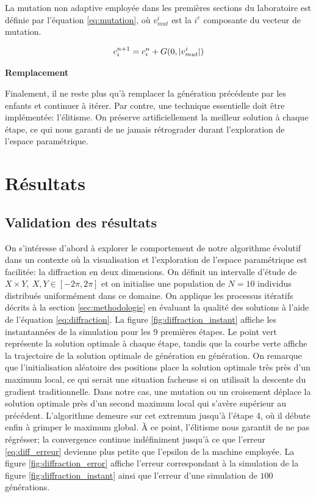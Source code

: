 \documentclass{article}
\DeclarePairedDelimiter\absol{\lvert}{\rvert}%
\begin{document}
La mutation non adaptive employée dans les premières sections du laboratoire est définie par l'équation \ref{eq:mutation}, où $v^i_{mut}$ est la $i^e$ composante du vecteur de mutation. 

\begin{equation}\label{eq:mutation}
	c^{n+1}_{i} = c^{n}_{i} + G(0, \absol{v^i_{mut}})
\end{equation}

\vspace{0.3cm}
\noindent\textbf{Remplacement}

Finalement, il ne reste plus qu'à remplacer la génération précédente par les enfants et continuer à itérer. Par contre, une technique essentielle doit être implémentée: l'élitisme. On préserve artificiellement la meilleur solution à chaque étape, ce qui nous garanti de ne jamais rétrograder durant l'exploration de l'espace paramétrique. 


\section{Résultats}\label{sec:resultat}

\subsection{Validation des résultats}

On s'intéresse d'abord à explorer le comportement de notre algorithme évolutif dans un contexte où la visualisation et l'exploration de l'espace paramétrique est facilitée: la diffraction en deux dimensions. On définit un intervalle d'étude de $X \times Y,\ X,Y \in [-2 \pi, 2 \pi]$ et on initialise une population de $N=10$ individus distribués uniformément dans ce domaine. On applique les processus itératifs décrits à la section \ref{sec:methodologie} en évaluant la qualité des solutions à l'aide de l'équation \ref{eq:diffraction}. La figure \ref{fig:diffraction_instant} affiche les instantannées de la simulation pour les 9 premières étapes. Le point vert représente la solution optimale à chaque étape, tandis que la courbe verte affiche la trajectoire de la solution optimale de génération en génération. On remarque que l'initialisation aléatoire des positions place la solution optimale très près d'un maximum local, ce qui serait une situation facheuse si on utilisait la descente du gradient traditionnelle. Dans notre cas, une mutation ou un croisement déplace la solution optimale près d'un second maximum local qui s'avère supérieur au précédent. L'algorithme demeure sur cet extremum jusqu'à l'étape 4, où il débute enfin à grimper le maximum global. À ce point, l'élitisme nous garantit de ne pas régrésser; la convergence continue indéfiniment jusqu'à ce que l'erreur \ref{eq:diff_erreur} devienne plus petite que l'epsilon de la machine employée. La figure \ref{fig:diffraction_error} affiche l'erreur correspondant à la simulation de la figure \ref{fig:diffraction_instant} ainsi que l'erreur d'une simulation de $100$ générations. 
\end{document}
